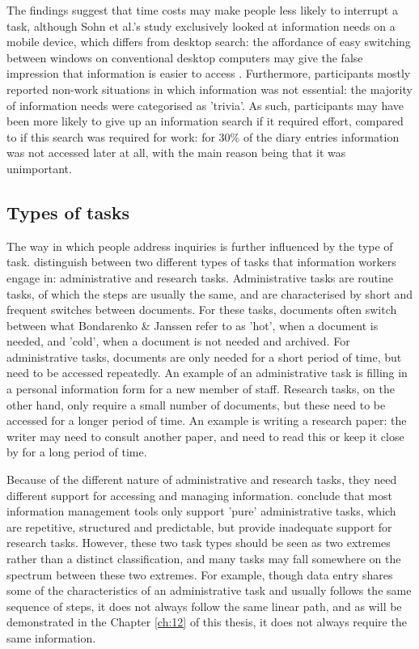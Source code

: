 The findings suggest that time costs may make people less likely to interrupt a task, although Sohn et al.’s study exclusively looked at information needs on a mobile device, which differs from desktop search: the affordance of easy switching between windows on conventional desktop computers may give the false impression that information is easier to access \citep{Sellen2003}. Furthermore, participants mostly reported non-work situations in which information was not essential: the majority of information needs were categorised as 'trivia'. As such, participants may have been more likely to give up an information search if it required effort, compared to if this search was required for work: for 30\% of the diary entries information was not accessed later at all, with the main reason being that it was unimportant. 

\subsection{Types of tasks}
The way in which people address inquiries is further influenced by the type of task. \citet{Bondarenko2005} distinguish between two different types of tasks that information workers engage in: administrative and research tasks. Administrative tasks are routine tasks, of which the steps are usually the same, and are characterised by short and frequent switches between documents. For these tasks, documents often switch between what Bondarenko \& Janssen refer to as 'hot', when a document is needed, and 'cold', when a document is not needed and archived. For administrative tasks, documents are only needed for a short period of time, but need to be accessed repeatedly. An example of an administrative task is filling in a personal information form for a new member of staff. Research tasks, on the other hand, only require a small number of documents, but these need to be accessed for a longer period of time. An example is writing a research paper: the writer may need to consult another paper, and need to read this or keep it close by for a long period of time.

Because of the different nature of administrative and research tasks, they need different support for accessing and managing information. \citet{Bondarenko2005} conclude that most information management tools only support 'pure' administrative tasks, which are repetitive, structured and predictable, but provide inadequate support for research tasks. However, these two task types should be seen as two extremes rather than a distinct classification, and many tasks may fall somewhere on the spectrum between these two extremes. For example, though data entry shares some of the characteristics of an administrative task and usually follows the same sequence of steps, it does not always follow the same linear path, and as will be demonstrated in the Chapter \ref{ch:12} of this thesis, it does not always require the same information. 

